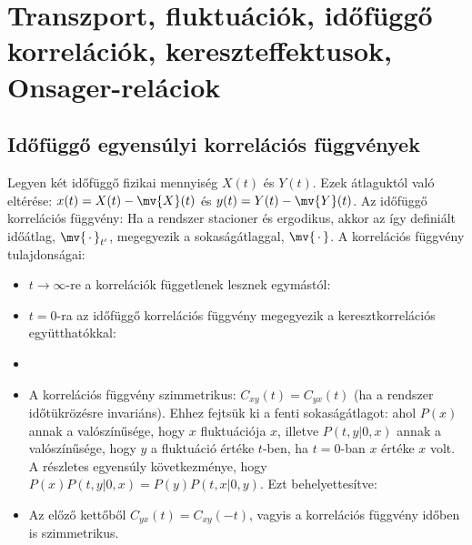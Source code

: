 \chapter{Transzport, fluktu\'aci\'ok, id\H{o}f\"ugg\H{o} korrel\'aci\'ok, kereszteffektusok, Onsager-rel\'aciok} 
 
 \section{Időfüggő egyensúlyi korrelációs függvények}
  
  Legyen két időfüggő fizikai mennyiség $X(t)$ és $Y(t)$.
   Ezek átlaguktól való eltérése: $x(t)=X(t)-\mv{X}(t)$ és $y(t)=Y(t)-\mv{Y}(t)$.
   Az időfüggő korrelációs függvény:
  Ha a rendszer stacioner és ergodikus, akkor az így definiált időátlag, $\mv{\,\cdot\,}_{t'}$, megegyezik a sokaságátlaggal, $\mv{\,\cdot\,}$.
   A korrelációs függvény tulajdonságai:
  \begin{itemize}
   \item 
    $t\to\infty$-re a korrelációk függetlenek lesznek egymástól:
    
   \item
    $t=0$-ra az időfüggő korrelációs függvény megegyezik a keresztkorrelációs együtthatókkal:
    
   \item 
   \item 
    A korrelációs függvény szimmetrikus: $C_{xy}(t)=C_{yx}(t)$ (ha a rendszer időtükrözésre invariáns).
   Ehhez fejtsük ki a fenti sokaságátlagot:
    ahol $P(x)$ annak a valószínűsége, hogy $x$ fluktuációja $x$, illetve $P(t,y|0,x) $ annak a valószínűsége, hogy $y$ a fluktuáció értéke $t$-ben, ha $t=0$-ban $x$ értéke $x$ volt.
   A részletes egyensúly következménye, hogy $P(x) P(t,y|0,x)=P(y) P(t,x|0,y)$.
   Ezt behelyettesítve:
   
   \item 
    Az előző kettőből $C_{yx}(t)=C_{xy}(-t)$, vagyis a korrelációs függvény időben is szimmetrikus. 
  \end{itemize}
  
